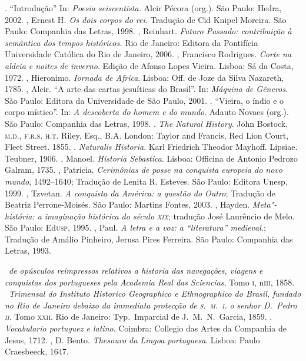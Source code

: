\begin{bibliohedra}
\titidem. ``Introdução'' In: \textit{Poesia seiscentista.} Alcir Pécora (org.). São Paulo:
Hedra, 2002.
, Ernest H\textit{. Os dois corpos do rei.} Tradução de Cid
Knipel Moreira. São Paulo: Companhia das Letras, 1998.
, Reinhart. \textit{Futuro Passado: contribuição à
semântica dos tempos históricos.}  Rio de Janeiro: Editora da
Pontifícia Universidade Católica do Rio de Janeiro, 2006.
, Francisco Rodrigues. \textit{Corte na aldeia e noites de inverno}.
Edição de Afonso Lopes Vieira. Lisboa: Sá da
Costa, 1972.
, Hieronimo. \textit{Iornada de Africa}.
Lisboa: Off. de Joze da Silva Nazareth, 1785.
, Alcir. ``A arte das cartas jesuíticas do Brasil''. In: \textit{Máquina de
Gêneros}. São Paulo: Editora da Universidade de São Paulo, 2001. 
\titidem. ``Vieira, o índio e o corpo místico''. In: \textit{A
descoberta do homem e do mundo}. Adauto Novaes (org.). São Paulo:
Companhia das Letras, 1998.
. \textit{The Natural History}. John Bostock, \textsc{m.d., f.r.s.
h.t.} Riley, Esq., B.A. London: Taylor and Francis, Red Lion Court,
Fleet Street. 1855.
\titidem. \textit{Naturalis Historia}. Karl Friedrich Theodor
Mayhoff. Lipsiae. Teubner, 1906.
, Manoel. \textit{Historia Sebastica}. Lisboa: Officina de Antonio Pedrozo Galram, 1735. 
, Patricia. \textit{Cerimônias de posse na conquista europeia do novo mundo}, 1492--1640; 
Tradução de Lenita R. Esteves. São Paulo: Editora
Unesp, 1999.
, Tzvetan. \textit{A conquista da América: a questão do Outro}; Tradução de 
Beatriz Perrone-Moisés. São Paulo: Martins Fontes, 2003.
, Hayden. \textit{Meta"-história: a imaginação histórica do século \textsc{xix}};
tradução José Laurêncio de Melo. São Paulo: Ed\textsc{usp}, 1995.
, Paul. \textit{A letra e a voz: a ``literatura'' medieval.}; Tradução de Amálio
Pinheiro, Jerusa Pires Ferreira. São Paulo: Companhia das Letras, 1993.

\medskip
{}

\ \textit{de opúsculos reimpressos relativos a historia
das navegações, viagens e conquistas dos portugueses pela Academia Real
das Sciencias}, Tomo \textsc{i}, n\oi \textsc{iii}, 1858.
\ \textit{Trimensal do Instituto Historico Geographico e
Ethnographico do Brasil, fundado no Rio de Janeiro debaixo da immediata
protecção de \textsc{s.~m.~i.} o senhor D.~Pedro \textsc{ii}}. Tomo \textsc{xxii}. Rio de Janeiro:
Typ.~Imparcial de J.~M.~N.~Garcia, 1859.
. \textit{Vocabulario portuguez e latino}. Coimbra: Collegio das Artes da Companhia de
Jesus, 1712. \enlargethispage{\baselineskip}
, D. Bento. \textit{Thesouro da Lingoa portuguesa}. Lisboa: Paulo Craesbeeck, 1647.
\end{bibliohedra}

